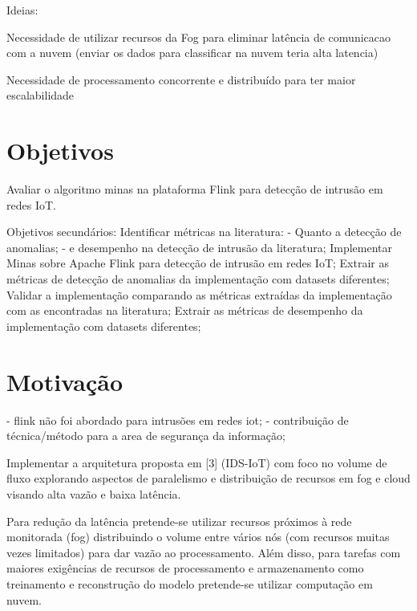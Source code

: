 Ideias:

Necessidade de utilizar recursos da Fog para eliminar latência de comunicacao com a nuvem (enviar os dados para classificar na nuvem teria alta latencia)

Necessidade de processamento concorrente e distribuído para ter maior escalabilidade

\section{Objetivos}

Avaliar o algoritmo minas na plataforma Flink para detecção de intrusão em redes IoT.


Objetivos secundários:
Identificar métricas na literatura:
    - Quanto a detecção de anomalias;
    - e desempenho na detecção de intrusão da literatura;
Implementar Minas sobre Apache Flink para detecção de intrusão em redes IoT;
Extrair as métricas de detecção de anomalias da implementação com datasets diferentes;
Validar a implementação comparando as métricas extraídas da implementação com as encontradas na literatura;
Extrair as métricas de desempenho da implementação com datasets diferentes;

\section{Motivação}
- flink não foi abordado para intrusões em redes iot;
- contribuição de técnica/método para a area de segurança da informação;

Implementar a arquitetura proposta em [3] (IDS-IoT) com foco no volume de fluxo
explorando aspectos de paralelismo e distribuição de recursos em fog e cloud visando
alta vazão e baixa latência.

Para redução da latência pretende-se utilizar recursos próximos à rede monitorada (fog) 
distribuindo o volume entre vários nós (com recursos muitas vezes limitados) para dar
vazão ao processamento. Além disso, para tarefas com maiores exigências de recursos de
processamento e armazenamento como treinamento e reconstrução do modelo pretende-se utilizar computação em nuvem.

